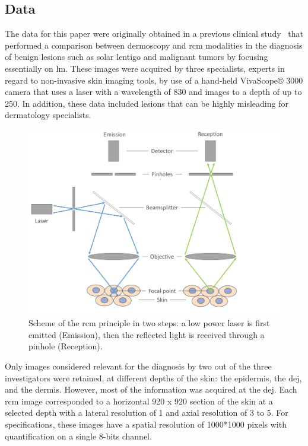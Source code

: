 \documentclass[journal,article,submit,moreauthors,pdftex, applsci]{Definitions/mdpi}
\begin{document}
\subsection{Data}
\label{sec:data}
The data for this paper were originally obtained in a previous clinical study~\cite{Cinotti2018} that performed a comparison between dermoscopy and \ac{rcm} modalities in the diagnosis of benign lesions such as solar lentigo and malignant tumors by focusing essentially on \ac{lm}. These images were acquired by three specialists, experts in regard to non-invasive skin imaging tools, by use of a hand-held VivaScope® 3000 camera that uses a laser with a wavelength of \unit{830}{\nano\meter} and images to a depth of up to \unit{250}{\micro\meter}. In addition, these data included lesions that can be highly misleading for dermatology specialists.\par
\begin{figure}[H]
    \begin{center}
        \includegraphics[width=0.7\linewidth]{Figures/RCM.pdf}
        \caption{Scheme of the \ac{rcm} principle in two steps: a low power laser is first emitted (Emission), then the reflected light is received through a pinhole (Reception).}
        \label{fig:rcm}
    \end{center} 
\end{figure}\par
Only images considered relevant for the diagnosis by two out of the three investigators were retained, at different depths of the skin: the epidermis, the \ac{dej}, and the dermis. However, most of the information was acquired at the \ac{dej}. Each \ac{rcm} image corresponded to a horizontal \unit{920}{\micro\meter} x \unit{920}{\micro\meter} section of the skin at a selected depth with a lateral resolution of \unit{1}{\micro\meter} and axial resolution of \unit{3}{\micro\meter} to \unit{5}{\micro\meter}. For specifications, these images have a spatial resolution of 1000*1000 pixels with quantification on a single 8-bits channel.\par
\end{document}
